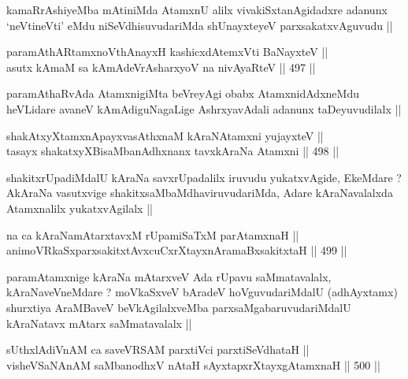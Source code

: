 \begin{artha}
kamaRrAshiyeMba mAtiniMda AtamxnU alilx vivakiSxtanAgidadxre adanunx
`neVtineVti' eMdu niSeVdhisuvudariMda shUnayxteyeV parxsakatxvAguvudu ||
\end{artha}


\begin{shl}
paramAthARtamxnoV\s thAnayxH kashicxdAtemxVti BaNayxteV || \\
asutx kAmaM sa kAmAdeVrAsharxyoV na nivAyaRteV ||  497 ||  
\end{shl}

\begin{artha}
paramAthaRvAda AtamxnigiMta beVreyAgi obabx AtamxnidAdxneMdu heVLidare
avaneV kAmAdiguNagaLige AshrxyavAdali adanunx taDeyuvudilalx ||
\end{artha}

\begin{shl}
shakAtxyXtamxnA\s payxvasAthxnaM kAraNAtamxni yujayxteV || \\
tasayx shakatxyXBisaMbanAdhxnanx tavxkAraNa Atamxni ||  498 ||  
\end{shl}

\begin{artha}
shakitxrUpadiMdalU kAraNa savxrUpadalilx iruvudu yukatxvAgide,
EkeMdare ? AkAraNa vasutxvige shakitxsaMbaMdhaviruvudariMda, Adare
kAraNavalalxda Atamxnalilx yukatxvAgilalx ||
\end{artha}

\begin{shl}
na ca kAraNamAtarxtavxM rUpamiSaTxM parAtamxnaH || \\
animoVRkaSxparxsakitxtAvxcuCxrXtayxnAramaBxsakitxtaH ||  499 ||  
\end{shl}

\begin{artha}
paramAtamxnige kAraNa mAtarxveV Ada rUpavu saMmatavalalx,
kAraNaveVneMdare ? moVkaSxveV bAradeV hoVguvudariMdalU (adhAyxtamx)
shurxtiya AraMBaveV beVkAgilalxveMba parxsaMgabaruvudariMdalU
kAraNatavx mAtarx saMmatavalalx ||
\end{artha}


\begin{shl}
sUthxlAdiVnAM ca saveVRSAM parxtiVci parxtiSeVdhataH || \\
visheVSaNAnAM saMbanodhxV nAtaH sAyxtapxrXtayxgAtamxnaH ||  500 ||  
\end{shl}

